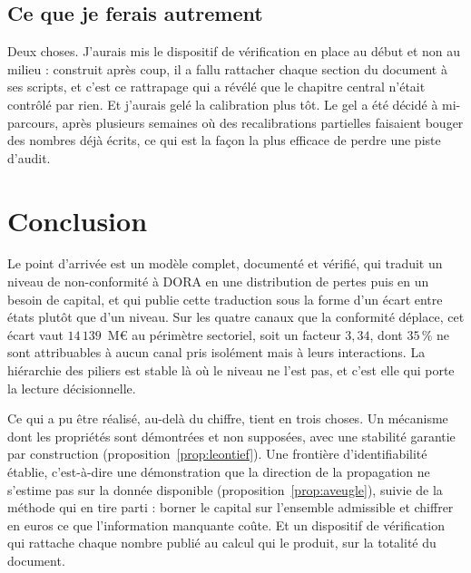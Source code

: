 \documentclass[12pt,a4paper]{article}
\theoremstyle{definition}
\begin{document}
\subsection{Ce que je ferais autrement}
\label{ss:autrement}

Deux choses. J'aurais mis le dispositif de vérification en place au début et non au
milieu : construit après coup, il a fallu rattacher chaque section du document à
ses scripts, et c'est ce rattrapage qui a révélé que le chapitre central n'était
contrôlé par rien. Et j'aurais gelé la calibration plus tôt. Le gel a été décidé à
mi-parcours, après plusieurs semaines où des recalibrations partielles faisaient
bouger des nombres déjà écrits, ce qui est la façon la plus efficace de perdre une
piste d'audit.

\section{Conclusion}
\label{s:conclusion}

Le point d'arrivée est un modèle complet, documenté et vérifié, qui traduit un
niveau de non-conformité à DORA en une distribution de pertes puis en un besoin de
capital, et qui publie cette traduction sous la forme d'un écart entre états plutôt
que d'un niveau. Sur les quatre canaux que la conformité déplace, cet écart vaut
$14\,139$~M\euro{} au périmètre sectoriel, soit un facteur $3{,}34$, dont $35\,\%$
ne sont attribuables à aucun canal pris isolément mais à leurs interactions. La
hiérarchie des piliers est stable là où le niveau ne l'est pas, et c'est elle qui
porte la lecture décisionnelle.

Ce qui a pu être réalisé, au-delà du chiffre, tient en trois choses. Un mécanisme
dont les propriétés sont démontrées et non supposées, avec une stabilité garantie
par construction (proposition~\ref{prop:leontief}). Une frontière
d'identifiabilité établie, c'est-à-dire une démonstration que la direction de la
propagation ne s'estime pas sur la donnée disponible
(proposition~\ref{prop:aveugle}), suivie de la méthode qui en tire parti : borner
le capital sur l'ensemble admissible et chiffrer en euros ce que l'information
manquante coûte. Et un dispositif de vérification qui rattache chaque nombre
publié au calcul qui le produit, sur la totalité du document.
\end{document}
